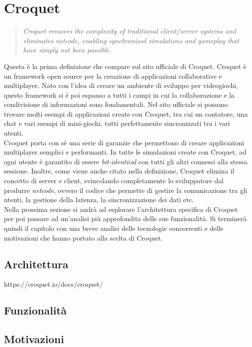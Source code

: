 \section{Croquet}\label{sec:Croquet}
\begin{quote}
    \textit{Croquet removes the complexity of traditional client/server systems and eliminates netcode, enabling synchronized simulations and gameplay that have simply not been 
    possible.}\cite{Croquet}
\end{quote}
Questa è la prima definizione che compare sul sito ufficiale di Croquet. Croquet è un framework open source per la creazione di applicazioni collaborative e 
multiplayer. Nato con l'idea di creare un ambiente di sviluppo per videogiochi, questo framework si è poi espanso a tutti i campi in cui la collaborazione e la condivisione
di informazioni sono fondamentali. Nel sito ufficiale si possono trovare molti esempi di applicazioni create con Croquet, tra cui un contatore, una chat e vari esempi di mini-giochi, tutti
perfettamente sincronizzati tra i vari utenti.\\
Croquet porta con sè una serie di garanzie che permettono di creare applicazioni multiplayer semplici e performanti. In tutte le simulazioni create con Croquet, ad ogni utente
è garantito di essere \textit{bit-identical} con tutti gli altri connessi alla stessa sessione. Inoltre, come viene anche citato nella definizione, Croquet elimina il concetto
di server e client, svincolando completamente lo sviluppatore dal produrre \textit{netcode}, ovvero il codice che permette di gestire la comunicazione tra gli utenti, la gestione della 
latenza, la sincronizzazione dei dati etc.\\ 
Nella prossima sezione si andrà ad esplorare l'architettura specifica di Croquet per poi passare ad un'analisi più approfondita delle sue funzionalità. Si terminerà quindi il capitolo
con una breve analisi delle tecnologie concorrenti e delle motivazioni che hanno portato alla scelta di Croquet.\\

\subsection{Architettura}\label{subsec:Croquet_architettura}
https://croquet.io/docs/croquet/
\subsection{Funzionalità}\label{subsec:Croquet_funzionalita}
\subsection{Motivazioni}\label{subsec:Croquet_motivazioni}